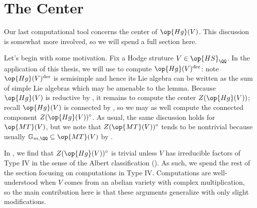 \documentclass[../thesis.tex]{subfiles}
\begin{document}
\section{The Center} \label{sec:center}
Our last computational tool concerns the center of $\op{Hg}(V)$. This discussion is somewhat more involved, so we will spend a full section here.

Let's begin with some motivation. Fix a Hodge struture $V\in\op{HS}_\QQ$. In the application of this thesis, we will use  to compute $\op{Hg}(V)^{\mathrm{der}}$: note $\op{Hg}(V)^{\mathrm{der}}$ is semisimple and hence its Lie algebra can be written as the sum of simple Lie algebras which may be amenable to the lemma. Because $\op{Hg}(V)$ is reductive by , it remains to compute the center $Z(\op{Hg}(V))$; recall $\op{Hg}(V)$ is connected by , so we may as well compute the connected component $Z(\op{Hg}(V))^\circ$. As usual, the same discussion holds for $\op{MT}(V)$, but we note that $Z(\op{MT}(V))^\circ$ tends to be nontrivial because usually $\mathbb G_{m,\QQ}\subseteq\op{MT}(V)$ by .

In , we find that $Z(\op{Hg}(V))^\circ$ is trivial unless $V$ has irreducible factors of Type IV in the sense of the Albert classification (). As such, we spend the rest of the section focusing on computations in Type IV. Computations are well-understood when $V$ comes from an abelian variety with complex multiplication, so the main contribution here is that these arguments generalize with only slight modifications.
\end{document}
